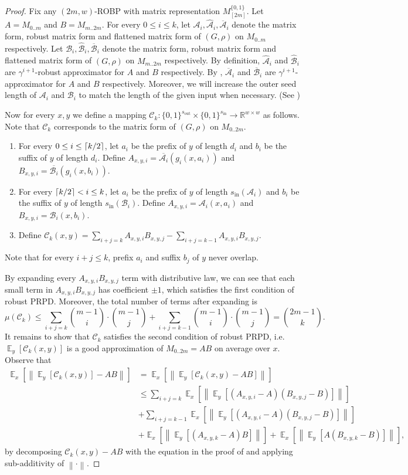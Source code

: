 \documentclass[10pt,a4paper]{article}
\DeclareMathOperator*{\Ex}{\mathbb E}
\newcommand{\ex}[2][]{\Ex_{#1}\left[#2\right]}
\newcommand{\norm}[2][]{\left\|#2\right\|_{#1}}
\DeclarePairedDelimiter\ceil{\lceil}{\rceil}
\newcommand{\bbR}{\mathbb R}
\newcommand{\cA}{\mathcal A}
\newcommand{\cB}{\mathcal B}
\newcommand{\cC}{\mathcal C}
\newcommand{\bits}[1]{\{0,1\}^{#1}}
\newcommand{\bit}{\{0,1\}}
\newcommand{\wt}{\mu}
\newcommand{\sout}[1][]{s_{\mathrm{out}#1}}
\newcommand{\si}[1][]{s_{\mathrm{in}#1}}
\begin{document}
\begin{proof}
Fix any $(2m,w)$-ROBP with matrix representation $M_{[2m]}^{\bit}$. Let $A=M_{0..m}$ and $B=M_{m..2m}$.
 For every $0\le i\le k$, let $\cA_i,\widehat{\cA}_i,\overline{\cA}_i$ denote the matrix form, robust matrix form and flattened matrix form of $(G,\rho)$ on $M_{0..m}$ respectively. Let $\cB_i,\widehat{\cB}_i,\overline{\cB}_i$ denote the matrix form, robust matrix form and flattened matrix form of $(G,\rho)$ on $M_{m..2m}$ respectively. By definition, $\widehat{\cA}_i$ and $\widehat{\cB}_i$ are $\gamma^{i+1}$-robust approximator for $A$ and $B$ respectively. By , $\overline{\cA}_i$ and $\overline{\cB}_i$ are $\gamma^{i+1}$-approximator for $A$ and $B$ respectively. Moreover, we will increase the outer seed length of $\cA_i$ and $\cB_i$ to match the length of the given input when necessary. (See )
 
Now for every $x,y$ we define a mapping $\cC_k:\bits{\sout}\times\bits{\si}\to\bbR^{w\times w}$ as follows. Note that $\cC_k$ corresponds to the matrix form of $(G,\rho)$ on $M_{0..2m}$.
\begin{enumerate}[(1)]
\item
For every $0\le i\le \ceil{k/2}$, let $a_i$ be the prefix of $y$ of length $d_i$ and $b_i$ be the suffix of $y$ of length $d_i$. Define $A_{x,y,i}=\overline{\cA_i}(g_i(x,a_i))$ and $B_{x,y,i}=\overline{\cB_i}(g_i(x,b_i))$.
\item
For every $\ceil{k/2}<i\le k$, let $a_i$ be the prefix of $y$ of length $\si(\cA_i)$ and $b_i$ be the suffix of $y$ of length $\si(\cB_i)$. Define $A_{x,y,i}=\cA_i(x,a_i)$ and $B_{x,y,i}=\cB_i(x,b_i)$.
\item
Define $\cC_k(x,y)=\sum_{i+j=k} A_{x,y,i}B_{x,y,j}-\sum_{i+j=k-1}A_{x,y,i}B_{x,y,j}$.
\end{enumerate}
Note that for every $i+j\le k$, prefix $a_i$ and suffix $b_j$ of $y$ never overlap.

By expanding every $A_{x,y,i}B_{x,y,j}$ term with distributive law, we can see that each small term in $A_{x,y,i}B_{x,y,j}$ has coefficient $\pm 1$, which satisfies the first condition of robust PRPD. Moreover, the total number of terms after expanding is 
$$\wt(\cC_k)\le \sum_{i+j=k}\binom{m-1}{i}\cdot \binom{m-1}{j} + \sum_{i+j=k-1}\binom{m-1}{i}\cdot \binom{m-1}{j}= \binom{2m-1}{k}.$$
It remains to show that $\cC_k$ satisfies the second condition of robust PRPD, i.e. $\ex[y]{\cC_k(x,y)}$ is a good approximation of $M_{0..2m}=AB$ on average over $x$. Observe that 
\begin{align*}
\ex[x]{\norm{\ex[y]{\cC_k(x,y)}-AB}}
&=\ex[x]{\norm{\ex[y]{\cC_k(x,y)-AB}}}\\
&\le \sum_{i+j=k} \ex[x]{\norm{\ex[y]{(A_{x,y,i}-A)(B_{x,y,j}-B)}}} \\
&+ \sum_{i+j=k-1} \ex[x]{\norm{\ex[y]{(A_{x,y,i}-A)(B_{x,y,j}-B)}}}\\
&+ \ex[x]{\norm{\ex[y]{(A_{x,y,k}-A)B}}} + \ex[x]{\norm{\ex[y]{A(B_{x,y,k}-B)}}},
\end{align*}
by decomposing $\cC_k(x,y)-AB$ with the equation in the proof of  and applying sub-additivity of $\norm{\cdot}$. 


\end{proof}
\end{document}
